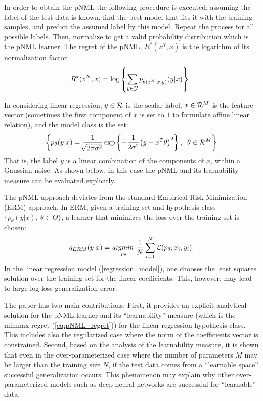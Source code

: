 \documentclass[conference,letterpaper]{IEEEtran}
\def\pNMLSingle{p_{\hat{\theta}(z^N,x,y)} (y|x)}
\begin{document}
In order to obtain the pNML the following procedure is executed: assuming the label of the test data is known, find the best model that fits it with the training samples, and predict the assumed label by this model. 
Repeat the process for all possible labels. 
Then, normalize to get a valid probability distribution which is the pNML learner.
The regret of the pNML, $R^*(z^N,x)$ is the logarithm of its normalization factor
\begin{equation} \label{eq:pNML_regret}
R^*(z^N,x) = \log \left\{ \sum_{y\in {\cal Y}} \pNMLSingle \right\}.
\end{equation}

In considering linear regression, $y\in {\cal R}$ is the scalar label, $x\in {\cal R}^M$ is the feature vector (sometimes the first component of $x$ is set to $1$ to formulate affine linear relation), and the model class is the set:
\begin{equation} \label{regression_model}
\left\{ p_{\theta}(y|x) 
=\frac{1}{\sqrt[]{2\pi\sigma^2}}\exp\left\{-\frac{1}{2\sigma^2}\big(y- x^T\theta \big)^2\right\}, \;\; \theta \in {\cal R}^M \right\} 
\end{equation}
That is, the label $y$ is a linear combination of the components of $x$, within a Gaussian noise. As shown below, in this case the pNML and its learnability measure can be evaluated explicitly.

The pNML approach deviates from the standard Empirical Risk Minimization (ERM) \cite{vapnik1992principles} approach.
In ERM, given a training set and hypothesis class $\{p_\theta(y|x),\ \theta \in \Theta\}$, a learner that minimizes the loss over the training set is chosen:
\begin{equation}
q_{\mbox{\tiny{ERM}}}(y|x) = \underset{p_\theta}{\textit{argmin }} \frac{1}{N}\sum_{i=1}^{N}  \mathcal{L}(p_\theta; x_i, y_i).
\end{equation}
In the linear regression model (\ref{regression_model}), one chooses the least squares solution over the training set for the linear coefficients. 
This, however, may lead to large log-loss generalization error.

The paper has two main contributions.
First, it provides an explicit analytical solution for the pNML learner and its ``learnability'' measure (which is the minmax regret (\ref{eq:pNML_regret})) for the linear regression hypothesis class. This includes also the regularized case where the norm of the coefficients vector is constrained. Second, based on the analysis of the learnability measure, it is shown that even in the over-parameterized case where the number of parameters $M$ may be larger than the training size $N$, if the test data comes from a ``learnable space'' successful generalization occurs.
This phenomenon may explain why other over-parameterized models such as deep neural networks are successful for ``learnable'' data.
\end{document}
